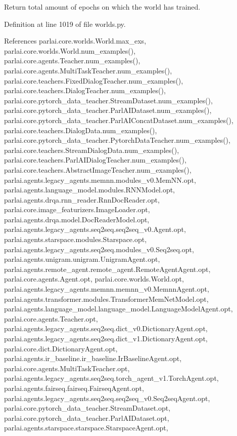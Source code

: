 \begin{DoxyVerb}Return total amount of epochs on which the world has trained.\end{DoxyVerb}
 

Definition at line 1019 of file worlds.\+py.



References parlai.\+core.\+worlds.\+World.\+max\+\_\+exs, parlai.\+core.\+worlds.\+World.\+num\+\_\+examples(), parlai.\+core.\+agents.\+Teacher.\+num\+\_\+examples(), parlai.\+core.\+agents.\+Multi\+Task\+Teacher.\+num\+\_\+examples(), parlai.\+core.\+teachers.\+Fixed\+Dialog\+Teacher.\+num\+\_\+examples(), parlai.\+core.\+teachers.\+Dialog\+Teacher.\+num\+\_\+examples(), parlai.\+core.\+pytorch\+\_\+data\+\_\+teacher.\+Stream\+Dataset.\+num\+\_\+examples(), parlai.\+core.\+pytorch\+\_\+data\+\_\+teacher.\+Parl\+A\+I\+Dataset.\+num\+\_\+examples(), parlai.\+core.\+pytorch\+\_\+data\+\_\+teacher.\+Parl\+A\+I\+Concat\+Dataset.\+num\+\_\+examples(), parlai.\+core.\+teachers.\+Dialog\+Data.\+num\+\_\+examples(), parlai.\+core.\+pytorch\+\_\+data\+\_\+teacher.\+Pytorch\+Data\+Teacher.\+num\+\_\+examples(), parlai.\+core.\+teachers.\+Stream\+Dialog\+Data.\+num\+\_\+examples(), parlai.\+core.\+teachers.\+Parl\+A\+I\+Dialog\+Teacher.\+num\+\_\+examples(), parlai.\+core.\+teachers.\+Abstract\+Image\+Teacher.\+num\+\_\+examples(), parlai.\+agents.\+legacy\+\_\+agents.\+memnn.\+modules\+\_\+v0.\+Mem\+N\+N.\+opt, parlai.\+agents.\+language\+\_\+model.\+modules.\+R\+N\+N\+Model.\+opt, parlai.\+agents.\+drqa.\+rnn\+\_\+reader.\+Rnn\+Doc\+Reader.\+opt, parlai.\+core.\+image\+\_\+featurizers.\+Image\+Loader.\+opt, parlai.\+agents.\+drqa.\+model.\+Doc\+Reader\+Model.\+opt, parlai.\+agents.\+legacy\+\_\+agents.\+seq2seq.\+seq2seq\+\_\+v0.\+Agent.\+opt, parlai.\+agents.\+starspace.\+modules.\+Starspace.\+opt, parlai.\+agents.\+legacy\+\_\+agents.\+seq2seq.\+modules\+\_\+v0.\+Seq2seq.\+opt, parlai.\+agents.\+unigram.\+unigram.\+Unigram\+Agent.\+opt, parlai.\+agents.\+remote\+\_\+agent.\+remote\+\_\+agent.\+Remote\+Agent\+Agent.\+opt, parlai.\+core.\+agents.\+Agent.\+opt, parlai.\+core.\+worlds.\+World.\+opt, parlai.\+agents.\+legacy\+\_\+agents.\+memnn.\+memnn\+\_\+v0.\+Memnn\+Agent.\+opt, parlai.\+agents.\+transformer.\+modules.\+Transformer\+Mem\+Net\+Model.\+opt, parlai.\+agents.\+language\+\_\+model.\+language\+\_\+model.\+Language\+Model\+Agent.\+opt, parlai.\+core.\+agents.\+Teacher.\+opt, parlai.\+agents.\+legacy\+\_\+agents.\+seq2seq.\+dict\+\_\+v0.\+Dictionary\+Agent.\+opt, parlai.\+agents.\+legacy\+\_\+agents.\+seq2seq.\+dict\+\_\+v1.\+Dictionary\+Agent.\+opt, parlai.\+core.\+dict.\+Dictionary\+Agent.\+opt, parlai.\+agents.\+ir\+\_\+baseline.\+ir\+\_\+baseline.\+Ir\+Baseline\+Agent.\+opt, parlai.\+core.\+agents.\+Multi\+Task\+Teacher.\+opt, parlai.\+agents.\+legacy\+\_\+agents.\+seq2seq.\+torch\+\_\+agent\+\_\+v1.\+Torch\+Agent.\+opt, parlai.\+agents.\+fairseq.\+fairseq.\+Fairseq\+Agent.\+opt, parlai.\+agents.\+legacy\+\_\+agents.\+seq2seq.\+seq2seq\+\_\+v0.\+Seq2seq\+Agent.\+opt, parlai.\+core.\+pytorch\+\_\+data\+\_\+teacher.\+Stream\+Dataset.\+opt, parlai.\+core.\+pytorch\+\_\+data\+\_\+teacher.\+Parl\+A\+I\+Dataset.\+opt, parlai.\+agents.\+starspace.\+starspace.\+Starspace\+Agent.\+opt, 